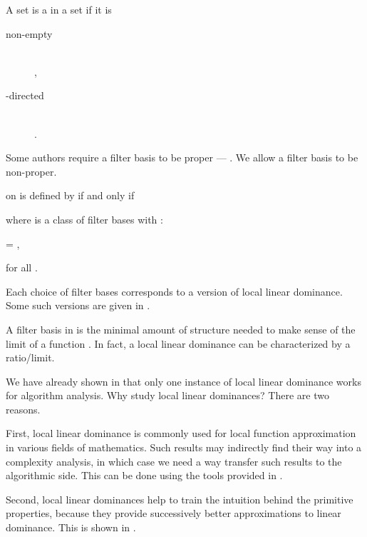 \documentclass[b5paper, english, oneside]{memoir}
\begin{document}
\begin{definition}
A set  is a  in a set  if it is
\begin{description}
\item[non-empty] \hfill \\ 
,
\item[-directed] \hfill \\
.
\end{description}
\end{definition}

\begin{note}
Some authors require a filter basis to be proper --- . We allow a filter basis to be non-proper.
\end{note}

\begin{definition}
  on  is defined by  if and only if

where  is a class of filter bases with :
\begin{eqs}
 = ,
\end{eqs}
for all .
\end{definition}

\begin{note}[Versions]
Each choice of filter bases corresponds to a version of local linear dominance. Some such versions are given in .
\end{note}

\begin{note}
A filter basis in  is the minimal amount of structure needed to make sense of the limit of a function . In fact, a local linear dominance can be characterized by a ratio\-/limit.
\end{note}

\begin{note}[Motivation]
We have already shown in  that only one instance of local linear dominance works for algorithm analysis. Why study local linear dominances? There are two reasons.

First, local linear dominance is commonly used for local function approximation in various fields of mathematics. Such results may indirectly find their way into a complexity analysis, in which case we need a way transfer such results to the algorithmic side. This can be done using the tools provided in .

Second, local linear dominances help to train the intuition behind the primitive properties, because they provide successively better approximations to linear dominance. This is shown in .
\end{note}
\end{document}
